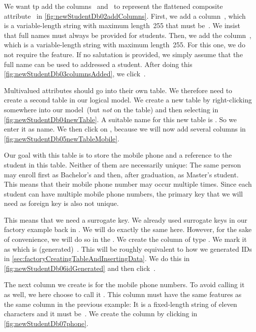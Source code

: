 We want tp add the columns~ and~ to represent the flattened composite attribute~ in \cref{fig:newStudentDb02addColumns}.
First, we add a column~, which is a variable-length string with maximum length~255 that must be~.
We insist that full names must always be provided for students.
Then, we add the column~, which is a variable-length string with maximum length~255.
For this one, we do not require the  feature.
If no salutation is provided, we simply assume that the full name can be used to addressed a student.
After doing this \cref{fig:newStudentDb03columnsAdded}, we click~.

Multivalued attributes should go into their own table.
We therefore need to create a second table in our logical model.
We create a new table by right-clicking somewhere into our model~(but \emph{not} on the  table) and then selecting  in \cref{fig:newStudentDb04newTable}.
A suitable name for this new table is .
So we enter it as name.
We then click on , because we will now add several columns in \cref{fig:newStudentDb05newTableMobile}.

Our goal with this table is to store the mobile phone and a reference to the student in this table.
Neither of them  are necessarily unique:
The same person may enroll first as Bachelor's and then, after graduation, as Master's student.
This means that their mobile phone number may occur multiple times.
Since each student can have multiple mobile phone numbers, the primary key  that we will need as foreign key is also not unique.

This means that we need a surrogate key.
We already used surrogate keys in our factory example back in .
We will do exactly the same here.
However, for the sake of convenience, we will do so in the \pgmodeler.
We create the column  of type .
We mark it as  which is (generated)~.
This will be roughly equivalent to how we generated IDs in \cref{sec:factoryCreatingTableAndInsertingData}.
We do this in \cref{fig:newStudentDb06idGenerated} and then click~.

The next column we create is for the mobile phone numbers.
To avoid calling it  as well, we here choose to call it .
This column must have the same features as the same column in the previous example:
It is a fixed-length string of eleven characters and it must be~.
We create the column by clicking  in \cref{fig:newStudentDb07phone}.

